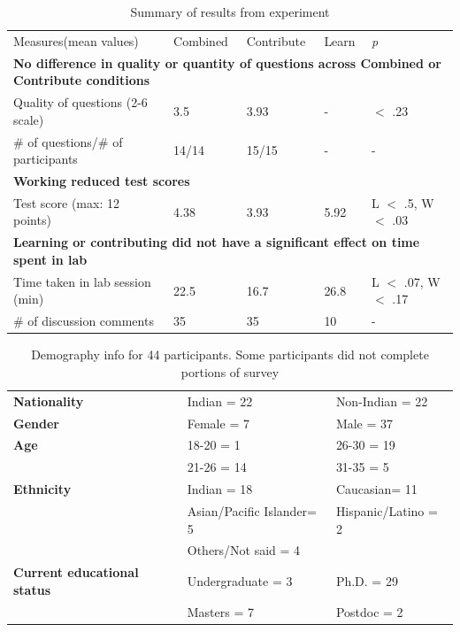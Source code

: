 \vspace{0.25in}
\begin{table}[!ht]
\caption[Summary of results from experiment]{Summary of results from experiment}

\vspace{-0.25in}
\begin{center}
\begin{tabular}{|p{1in}|p{1in}|p{1in}|p{1in}|p{1in}|}
\hline
Measures(mean values)	& Combined &	Contribute	& Learn	& {\it p} \\
\multicolumn{5}{|l|}{\bf No difference in quality or quantity of questions across Combined or Contribute conditions}   \\
Quality of questions (2-6 scale)  &	3.5 &	3.93	&-	& $<$ .23\\
\# of questions/\# of participants &	14/14 &	15/15 &	- &	-\\
\multicolumn{2}{|l|}{\bf  Working reduced test scores}  & & & \\
Test score (max: 12 points) & 4.38	& 3.93 & 5.92 & L $<$ .5, W $<$ .03 \\
\multicolumn{5}{|l|}{\bf Learning or contributing did not have a significant effect on time spent in lab }   \\
Time taken in lab session (min) & 22.5 & 16.7 & 26.8 & L $<$ .07, W $<$ .17\\
\# of discussion comments & 35 & 35 & 10 & - \\
\hline
\end{tabular}
\end{center}
\label{tab:gi-results1}
\end{table}


\vspace{0.25in}
\begin{table}[!ht]
\caption[Demography info for 44 participants. Some participants did not complete portions of survey]{Demography info for 44 participants. Some participants did not complete portions of survey}

\vspace{-0.25in}
\begin{center}
\begin{tabular}{|>{\bf}p{1in}|p{1in}|p{1in}|}
\hline
Nationality	&	Indian = 22	&	Non-Indian = 22\\
Gender		&	Female = 7	&	Male = 37\\
Age			&	18-20 = 1		& 	26-30 = 19\\
			&	21-26 = 14	&	31-35 = 5\\
Ethnicity		&	Indian = 18	& 	Caucasian= 11\\
		&Asian/Pacific Islander= 5	&	Hispanic/Latino = 2\\
		&	Others/Not said = 4	 &				\\
Current educational status & Undergraduate = 3	& Ph.D. = 29\\
			&	Masters = 7	&	Postdoc = 2\\
\hline
\end{tabular}
\end{center}
\label{tab:gi-results1}
\end{table}

